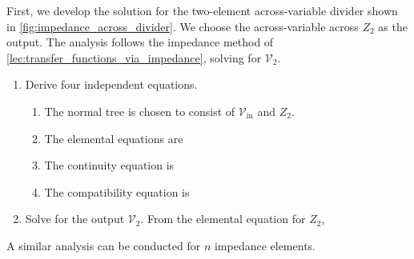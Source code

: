 \documentclass[dynamic_systems.tex]{subfiles}
\begin{document}
First, we develop the solution for the two-element across-variable divider shown in \autoref{fig:impedance_across_divider}.
We choose the across-variable across $Z_2$ as the output. 
The analysis follows the impedance method of \autoref{lec:transfer_functions_via_impedance}, solving for $\mathcal{V}_2$.
\tags{}
\begin{enumerate}
	\item Derive four independent equations.
		\begin{enumerate}
			\item The normal tree is chosen to consist of $\mathcal{V}_\text{in}$ and $Z_2$.
			\item The elemental equations are
			\item The continuity equation is 
			\item The compatibility equation is 
		\end{enumerate}
	\item Solve for the output $\mathcal{V}_2$.
	From the elemental equation for $Z_2$,
\end{enumerate}

A similar analysis can be conducted for $n$ impedance elements.
\tags{}

\end{document}
